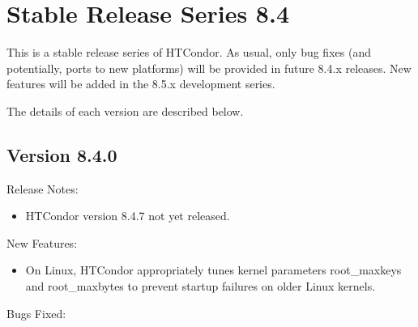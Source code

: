 
\section{\label{sec:History-8-4}Stable Release Series 8.4}

This is a stable release series of HTCondor.
As usual, only bug fixes (and potentially, ports to new platforms)
will be provided in future 8.4.x releases.
New features will be added in the 8.5.x development series.

The details of each version are described below.

\subsection*{\label{sec:New-8-4-0}Version 8.4.0}

\noindent Release Notes:

\begin{itemize}

\item HTCondor version 8.4.7 not yet released.

\end{itemize}


\noindent New Features:

\begin{itemize}

\item On Linux, HTCondor appropriately tunes kernel parameters
root\_maxkeys and root\_maxbytes to prevent  
startup failures on older Linux kernels.

\end{itemize}

\noindent Bugs Fixed:

